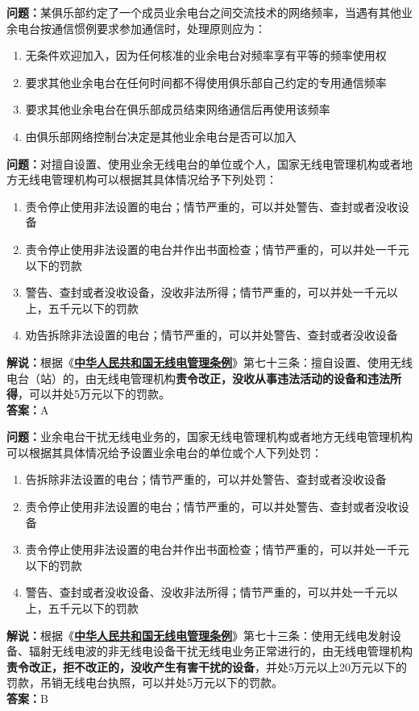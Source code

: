 \textbf{问题：}某俱乐部约定了一个成员业余电台之间交流技术的网络频率，当遇有其他业余电台按通信惯例要求参加通信时，处理原则应为：
\begin{enumerate}[label=\Alph*), leftmargin=1cm]
	\item 无条件欢迎加入，因为任何核准的业余电台对频率享有平等的频率使用权
	\item 要求其他业余电台在任何时间都不得使用俱乐部自己约定的专用通信频率
	\item 要求其他业余电台在俱乐部成员结束网络通信后再使用该频率
	\item 由俱乐部网络控制台决定是其他业余电台是否可以加入
\end{enumerate}


\textbf{问题：}对擅自设置、使用业余无线电台的单位或个人，国家无线电管理机构或者地方无线电管理机构可以根据其具体情况给予下列处罚：
\begin{enumerate}[label=\Alph*), leftmargin=1cm]
	\item  责令停止使用非法设置的电台；情节严重的，可以并处警告、查封或者没收设备
	\item  责令停止使用非法设置的电台并作出书面检查；情节严重的，可以并处一千元以下的罚款
	\item  警告、查封或者没收设备，没收非法所得；情节严重的，可以并处一千元以上，五千元以下的罚款
	\item  劝告拆除非法设置的电台；情节严重的，可以并处警告、查封或者没收设备
\end{enumerate}
\textbf{解说：}根据《\textbf{\href{http://www.gov.cn/zhengce/content/2016-11/25/content_5137687.htm}{中华人民共和国无线电管理条例}}》第七十三条：擅自设置、使用无线电台（站）的，由无线电管理机构\textbf{责令改正，没收从事违法活动的设备和违法所得}，可以并处5万元以下的罚款。\\
\textbf{答案：}A


\textbf{问题：}业余电台干扰无线电业务的，国家无线电管理机构或者地方无线电管理机构可以根据其具体情况给予设置业余电台的单位或个人下列处罚：
\begin{enumerate}[label=\Alph*), leftmargin=1cm]
	\item  告拆除非法设置的电台；情节严重的，可以并处警告、查封或者没收设备
	\item  责令停止使用非法设置的电台；情节严重的，可以并处警告、查封或者没收设备
	\item  责令停止使用非法设置的电台并作出书面检查；情节严重的，可以并处一千元以下的罚款
	\item  警告、查封或者没收设备、没收非法所得；情节严重的，可以并处一千元以上，五千元以下的罚款
\end{enumerate}
\textbf{解说：}根据《\textbf{\href{http://www.gov.cn/zhengce/content/2016-11/25/content_5137687.htm}{中华人民共和国无线电管理条例}}》第七十三条：使用无线电发射设备、辐射无线电波的非无线电设备干扰无线电业务正常进行的，由无线电管理机构\textbf{责令改正，拒不改正的，没收产生有害干扰的设备}，并处5万元以上20万元以下的罚款，吊销无线电台执照，可以并处5万元以下的罚款。\\
\textbf{答案：}B


